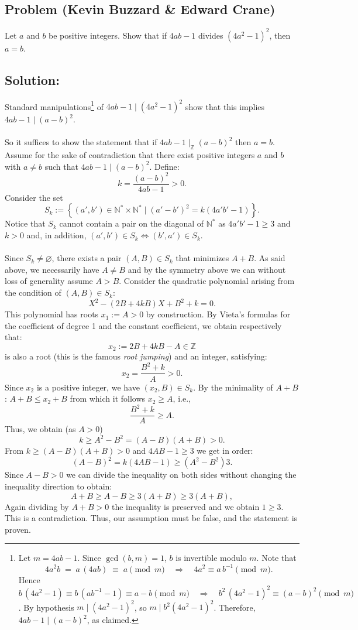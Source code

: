 \documentclass[11pt, a4paper, oneside]{article}
\newcommand{\solution}[1][]{\subsection*{#1}\hfill \par}
\theoremstyle{remark}
\theoremstyle{lemma}
\begin{document}
\subsection{Problem (Kevin Buzzard \& Edward Crane)}
Let $a$ and $b$ be positive integers. Show that if $4ab - 1$ divides $\left(4a^{2} - 1\right)^{2}$, then $a = b$. 

\solution[Solution:]

Standard manipulations\footnote{Let $m = 4ab - 1$. Since \(\gcd(b,m)=1\), \(b\) is invertible modulo \(m\).  Note that
\[
4a^2b \;=\;a\,(4ab)\;\equiv\;a\pmod{m}
\quad\Longrightarrow\quad
4a^2 \equiv a\,b^{-1} \pmod{m}.
\]
Hence $b\,(4a^2 - 1)\equiv b\,(ab^{-1}-1)\equiv a - b \pmod{m}
\quad\Longrightarrow\quad
b^2\,(4a^2 - 1)^2 \equiv (a-b)^2 \pmod{m}$. By hypothesis \(m\mid (4a^2-1)^2\), so \(m\mid b^2(4a^2-1)^2\).  Therefore, $4ab-1 \mid (a-b)^2$, as claimed.} of $4ab - 1 \mid \left(4a^{2} - 1\right)^{2}$ show that this implies $4ab - 1 \mid (a - b)^{2}$.
\\
\\
So it suffices to show the statement that if $4ab - 1 \mid_{\mathbb{Z}} (a - b)^2$ then $a = b$. Assume for the sake of contradiction that there exist positive integers $a$ and $b$ with $a \neq b$ such that $4ab - 1 \mid (a - b)^{2}$. Define:
\[
k = \frac{(a - b)^{2}}{4ab - 1} > 0.
\]
Consider the set
\[
S_k := \left\{ (a', b') \in \mathbb{N}^{*} \times \mathbb{N}^{*} \mid (a' - b')^{2} = k(4a'b' - 1) \right\}.
\]
Notice that $S_k$ cannot contain a pair on the diagonal of $\mathbb{N}^{*}$ as $4a'b' - 1 \geq 3$ and $k > 0$ and, in addition, $(a', b') \in S_k \Leftrightarrow (b', a') \in S_k$.
\\\\
Since $S_k \neq \varnothing$, there exists a pair $(A, B) \in S_k$ that minimizes $A + B$.  As said above, we necessarily have $A \neq B$ and by the symmetry above we can without loss of generality assume $A > B$. Consider the quadratic polynomial arising from the condition of $(A, B)\in S_k$:
\[
X^{2} - (2B + 4kB)X + B^{2} + k = 0.
\]
This polynomial has roots $x_1 := A > 0$ by construction. By Vieta's formulas for the coefficient of degree 1 and the constant coefficient, we obtain respectively that:
\[
x_2 := 2B + 4kB - A \in \mathbb{Z}
\]
is also a root (this is the famous \textit{root jumping}) and an integer, satisfying:
\[
x_2 = \frac{B^{2} + k}{A} > 0.
\]
Since $x_2$ is a positive integer, we have $(x_2, B) \in S_k$. By the minimality of $A + B$: $A + B \leq x_2 + B$ from which it follows $x_2 \geq A$, i.e.,
\[
\frac{B^{2} + k}{A} \geq A.
\]
Thus, we obtain (as $A>0$)
\[
k \geq A^{2} - B^{2} = (A - B)(A + B)>0.
\]
From $k\geq (A - B)(A + B)>0$ and $4AB-1\geq 3$ we get in order:
\[
(A - B)^{2} = k(4AB - 1)\geq \left(A^{2} - B^{2}\right)3.
\]
Since $A-B>0$ we can divide the inequality on both sides without changing the inequality direction to obtain:
\[
A + B \geq A - B \geq 3(A + B) \geq 3(A + B),
\]
Again dividing by $A+B>0$ the inequality is preserved and we obtain $1 \geq 3$. This is a contradiction. Thus, our assumption must be false, and the statement is proven.
\end{document}

